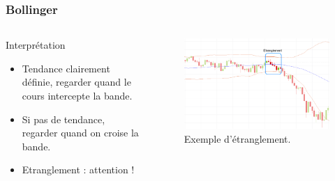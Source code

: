 \begin{frame}
    \frametitle{Bollinger}
    \begin{columns}
      \begin{column}{5cm}
	  \begin{block}{Interprétation}
		\begin{itemize}
		\item Tendance clairement définie, regarder quand le cours intercepte la bande.
		\item Si pas de tendance, regarder quand on croise la bande.
		\item Etranglement : attention !
		\end{itemize}
	  \end{block}
      \end{column}
    \begin{column}{5cm}
	\begin{figure}
	      \includegraphics[scale=0.25]{images/bollingerEtranglement.png}
	      \caption{Exemple d'étranglement.}
	  \end{figure}   
	\end{column}
    \end{columns}
\end{frame}

